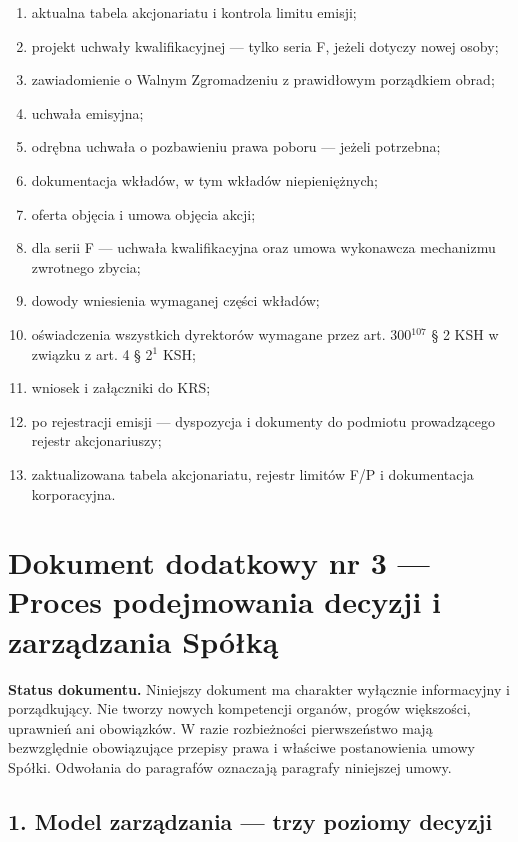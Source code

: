 \documentclass[12pt,a4paper]{report}
\newcounter{paragraf}
\begin{document}
\begin{enumerate}
  \item aktualna tabela akcjonariatu i kontrola limitu emisji;
  \item projekt uchwały kwalifikacyjnej --- tylko seria F, jeżeli dotyczy nowej osoby;
  \item zawiadomienie o Walnym Zgromadzeniu z prawidłowym porządkiem obrad;
  \item uchwała emisyjna;
  \item odrębna uchwała o pozbawieniu prawa poboru --- jeżeli potrzebna;
  \item dokumentacja wkładów, w tym wkładów niepieniężnych;
  \item oferta objęcia i umowa objęcia akcji;
  \item dla serii F --- uchwała kwalifikacyjna oraz umowa wykonawcza mechanizmu zwrotnego zbycia;
  \item dowody wniesienia wymaganej części wkładów;
  \item oświadczenia wszystkich dyrektorów wymagane przez art. 300$^{107}$ § 2 KSH w związku z art. 4 § 2$^{1}$ KSH;
  \item wniosek i załączniki do KRS;
  \item po rejestracji emisji --- dyspozycja i dokumenty do podmiotu prowadzącego rejestr akcjonariuszy;
  \item zaktualizowana tabela akcjonariatu, rejestr limitów F/P i dokumentacja korporacyjna.
\end{enumerate}



\clearpage
\section*{Dokument dodatkowy nr 3 — Proces podejmowania decyzji i zarządzania Spółką}
\label{annex:proces-decyzyjny}

\textbf{Status dokumentu.} Niniejszy dokument ma charakter wyłącznie informacyjny i porządkujący. Nie tworzy nowych kompetencji organów, progów większości, uprawnień ani obowiązków. W razie rozbieżności pierwszeństwo mają bezwzględnie obowiązujące przepisy prawa i właściwe postanowienia umowy Spółki. Odwołania do paragrafów oznaczają paragrafy niniejszej umowy.

\subsection*{1. Model zarządzania — trzy poziomy decyzji}
\end{document}
